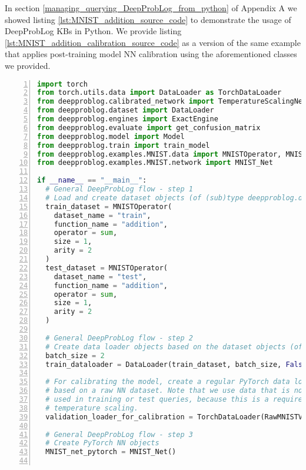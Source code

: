 In section \ref{managing_querying_DeepProbLog_from_python} of Appendix A we showed listing \ref{lst:MNIST_addition_source_code} to demonstrate the usage of DeepProbLog KBs in Python. We provide listing \ref{lst:MNIST_addition_calibration_source_code} as a version of the same example that applies post-training model NN calibration using the aforementioned classes we provided.
\begin{lstlisting}[language=Python, caption={deepproblog/src/deepproblog/examples/MNIST/basic\_addition\_calibration.py, the post training calibrated basic MNIST single-digit addition example}, numbers=left, label={lst:MNIST_addition_calibration_source_code}, captionpos=b]
import torch
from torch.utils.data import DataLoader as TorchDataLoader
from deepproblog.calibrated_network import TemperatureScalingNetwork, NetworkECECollector
from deepproblog.dataset import DataLoader
from deepproblog.engines import ExactEngine
from deepproblog.evaluate import get_confusion_matrix
from deepproblog.model import Model
from deepproblog.train import train_model
from deepproblog.examples.MNIST.data import MNISTOperator, MNIST_train, MNIST_test, RawMNISTValidationDataset
from deepproblog.examples.MNIST.network import MNIST_Net

if __name__ == "__main__":
  # General DeepProbLog flow - step 1
  # Load and create dataset objects (of (sub)type deepproblog.dataset.Dataset)
  train_dataset = MNISTOperator(
    dataset_name = "train",
    function_name = "addition",
    operator = sum,
    size = 1,
    arity = 2
  )
  test_dataset = MNISTOperator(
    dataset_name = "test",
    function_name = "addition",
    operator = sum,
    size = 1,
    arity = 2
  )

  # General DeepProbLog flow - step 2
  # Create data loader objects based on the dataset objects (of (sub)type deepproblog.dataset.DataLoader)
  batch_size = 2
  train_dataloader = DataLoader(train_dataset, batch_size, False)

  # For calibrating the model, create a regular PyTorch data loader
  # based on a raw NN dataset. Note that we use data that is no longer
  # used in training or test queries, because this is a requirement of
  # temperature scaling.
  validation_loader_for_calibration = TorchDataLoader(RawMNISTValidationDataset(), batch_size)

  # General DeepProbLog flow - step 3
  # Create PyTorch NN objects
  MNIST_net_pytorch = MNIST_Net()


\end{lstlisting}
